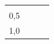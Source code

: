 {\begin{tabular}[t]{|l|l|l|l|}
    
         &
    
    
     \tabularnewline\cline{1-1}\cline{2-2}\cline{3-3}\cline{4-4}
    
    
        0,5 &
    
    
         &
    
    
         &
    
    
     \tabularnewline\cline{1-1}\cline{2-2}\cline{3-3}\cline{4-4}
    
    
        1,0 &
    
    
         &
    
    

\end{tabular}}
